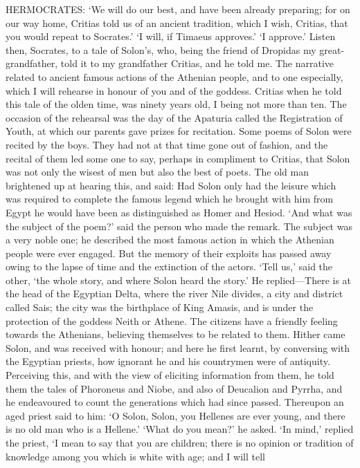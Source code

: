 HERMOCRATES: ‘We will do our best, and have been already preparing; for on
our way home, Critias told us of an ancient tradition, which I wish,
Critias, that you would repeat to Socrates.’ ‘I will, if Timaeus
approves.’ ‘I approve.’ Listen then, Socrates, to a tale of Solon’s, who,
being the friend of Dropidas my great-grandfather, told it to my
grandfather Critias, and he told me. The narrative related to ancient
famous actions of the Athenian people, and to one especially, which I will
rehearse in honour of you and of the goddess. Critias when he told this
tale of the olden time, was ninety years old, I being not more than ten.
The occasion of the rehearsal was the day of the Apaturia called the
Registration of Youth, at which our parents gave prizes for recitation.
Some poems of Solon were recited by the boys. They had not at that time
gone out of fashion, and the recital of them led some one to say, perhaps
in compliment to Critias, that Solon was not only the wisest of men but
also the best of poets. The old man brightened up at hearing this, and
said: Had Solon only had the leisure which was required to complete the
famous legend which he brought with him from Egypt he would have been as
distinguished as Homer and Hesiod. ‘And what was the subject of the poem?’
said the person who made the remark. The subject was a very noble one; he
described the most famous action in which the Athenian people were ever
engaged. But the memory of their exploits has passed away owing to the
lapse of time and the extinction of the actors. ‘Tell us,’ said the other,
‘the whole story, and where Solon heard the story.’ He replied—There
is at the head of the Egyptian Delta, where the river Nile divides, a city
and district called Sais; the city was the birthplace of King Amasis, and
is under the protection of the goddess Neith or Athene. The citizens have
a friendly feeling towards the Athenians, believing themselves to be
related to them. Hither came Solon, and was received with honour; and here
he first learnt, by conversing with the Egyptian priests, how ignorant he
and his countrymen were of antiquity. Perceiving this, and with the view
of eliciting information from them, he told them the tales of Phoroneus
and Niobe, and also of Deucalion and Pyrrha, and he endeavoured to count
the generations which had since passed. Thereupon an aged priest said to
him: ‘O Solon, Solon, you Hellenes are ever young, and there is no old man
who is a Hellene.’ ‘What do you mean?’ he asked. ‘In mind,’ replied the
priest, ‘I mean to say that you are children; there is no opinion or
tradition of knowledge among you which is white with age; and I will tell
